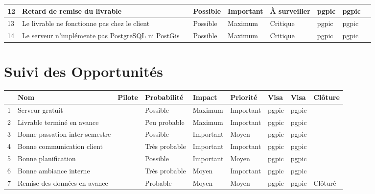 \documentclass[asi]{picInsa}
\begin{document}
\begin{longtable}{|p{0.3cm}|p{2.5cm}|p{2cm}|p{2cm}|p{1.8cm}|p{1.5cm}|p{1cm}|p{1cm}|p{1.5cm}|}
			 12 & Retard de remise du livrable & \Kafui & Possible & Important & À surveiller & pgpic & pgpic & \\\hline
			 
			 13 & Le livrable ne fonctionne pas chez le client & \Melissa & Possible & Maximum & Critique & pgpic & pgpic & \\\hline
			 
			 14 & Le serveur n’implémente pas PostgreSQL ni PostGis & \Sergi & Possible & Maximum & Critique & pgpic & pgpic & \\\hline
			 
\end{longtable}

\chapter*{Suivi des Opportunités}

\begin{longtable}{|p{0.3cm}|p{2.5cm}|p{2cm}|p{2cm}|p{1.8cm}|p{1.5cm}|p{1cm}|p{1cm}|p{1.5cm}|}
			\hline
			\rowcolor{gray!40}
			\No & Nom & Pilote & Probabilité & Impact & Priorité & Visa \RQCourt{} & Visa \CPCourt{} & Clôture \\\hline
			 1 & Serveur gratuit & \Matthieu & Possible & Maximum & Important & pgpic & pgpic & \\\hline
			 2 & Livrable terminé en avance & \Kafui & Peu probable & Maximum & Important & pgpic & pgpic & \\\hline
			 3 & Bonne passation inter-semestre & \Pierre & Possible & Important & Moyen & pgpic & pgpic & \\\hline
			 4 & Bonne communication client & \Florian & Très probable & Important & Important & pgpic & pgpic & \\\hline
			 5 & Bonne planification & \Pierre & Possible & Important & Moyen & pgpic & pgpic & \\\hline
			 6 & Bonne ambiance interne & \Michel & Très probable & Moyen & Important & pgpic & pgpic & \\\hline
			 7 & Remise des données en avance & \Sergi & Probable & Moyen & Moyen & pgpic & pgpic & Clôturé \\\hline
\end{longtable}
\end{document}
